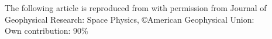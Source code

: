 
\newpage

The following article is reproduced from \textcite{Forstner-2018} with permission from Journal of Geophysical Research: Space Physics, \copyright American Geophysical Union:\\

\hfill Own contribution: 90\%

